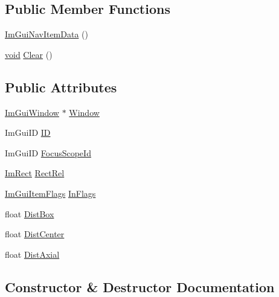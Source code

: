 \subsection*{Public Member Functions}
\begin{DoxyCompactItemize}
\item 
\hyperlink{structImGuiNavItemData_a205c145590dd784050377c628c2a1e44}{Im\+Gui\+Nav\+Item\+Data} ()
\item 
\hyperlink{imgui__impl__opengl3__loader_8h_ac668e7cffd9e2e9cfee428b9b2f34fa7}{void} \hyperlink{structImGuiNavItemData_a9da855d3d6ce1467b62ca21fbc0a4f09}{Clear} ()
\end{DoxyCompactItemize}
\subsection*{Public Attributes}
\begin{DoxyCompactItemize}
\item 
\hyperlink{structImGuiWindow}{Im\+Gui\+Window} $\ast$ \hyperlink{structImGuiNavItemData_ac2aefd3b2555404e8f5fd08f1fac7478}{Window}
\item 
Im\+Gui\+ID \hyperlink{structImGuiNavItemData_a055e520017f3ad0eb5f169547a1f6e04}{ID}
\item 
Im\+Gui\+ID \hyperlink{structImGuiNavItemData_ab48345d37b5469f750b9a2b22f54cc2c}{Focus\+Scope\+Id}
\item 
\hyperlink{structImRect}{Im\+Rect} \hyperlink{structImGuiNavItemData_a62029a2962e6eb2969306437bcada51d}{Rect\+Rel}
\item 
\hyperlink{imgui__internal_8h_abcf9eafab4557e911b2c0d8fe2feeb38}{Im\+Gui\+Item\+Flags} \hyperlink{structImGuiNavItemData_a422d45cb5778d98b95ff666962cdb1c0}{In\+Flags}
\item 
float \hyperlink{structImGuiNavItemData_a0cb7602721b84ab0c0e72bd9b0fc80ec}{Dist\+Box}
\item 
float \hyperlink{structImGuiNavItemData_aac9e18ba8cd4c7d7ab63fc94c845d296}{Dist\+Center}
\item 
float \hyperlink{structImGuiNavItemData_ad3259244c14b9f899582d047e8da1bf3}{Dist\+Axial}
\end{DoxyCompactItemize}


\subsection{Constructor \& Destructor Documentation}
\mbox{\label{structImGuiNavItemData_a205c145590dd784050377c628c2a1e44}} 
